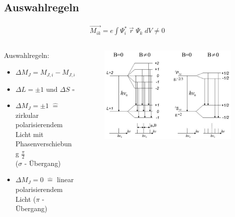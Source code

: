     \subsection{Auswahlregeln}
        \begin{myframe}{\subsecname}
                \vspace{-.7cm}
                \begin{align}
                    \vec{M_{ik}} = e \int \Psi_i^* \; \vec{r} \; \Psi_k \; dV \neq 0
                \end{align}
                \vspace{-.3cm}
                \begin{columns}
                    \begin{column}{0.48\textwidth}
                    Auswahlregeln:
                        \begin{itemize}
                            \item $\Delta M_J = M_{J,i} - M_{J,k} = 0, \pm 1 $
                            \item $\Delta L = \pm 1 \text{ und } \Delta S = 0 $
                            \item $\Delta M_J = \pm 1 \; \widehat{=}$ zirkular polarisierendem Licht mit Phasenverschiebung $\frac{\pi}{2}$ \\ ($\sigma$ - Übergang)
                            \item $\Delta M_J = 0 \; \widehat{=}$ linear polarisierendem Licht ($\pi$ - Übergang)
                        \end{itemize}
                    \end{column}
                    \begin{column}{0.48\textwidth}
                        \begin{figure}
                            \includegraphics[width=0.8\linewidth]{img/zeemanSplittingScheme.png}

\end{figure}
\end{column}
\end{columns}
\end{myframe}
